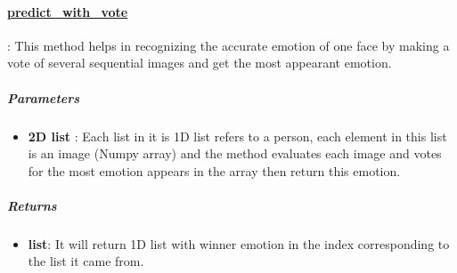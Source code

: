 \begin{comment}

\begin{itemize}
	\item call method:
	\begin{lstlisting}[language=Python]
	model.predict(faces, prob_emotion=False)\end{lstlisting}
\end{itemize}
\end{comment}
\hrulefill

\paragraph{\underline{predict\_with\_vote}}:
This method helps in recognizing the accurate emotion of one face by making a vote of several sequential images and get the most appearant emotion. \newline

\subparagraph{Parameters}
\begin{changemargin}{0.5cm}{0cm}
\begin{itemize}
	\item \textbf{2D list }:\newline
	Each list in it is 1D list refers to a person, each element in this list is an image (Numpy array) and the method evaluates each image and votes for the most emotion appears in the array then return this emotion.
\end{itemize}
\end{changemargin}

\subparagraph{Returns}
\begin{changemargin}{0.5cm}{0cm}
\begin{itemize}
	\item \textbf{list}:\newline
	It will return 1D list with winner emotion in the index corresponding to the list it came from.
\end{itemize}
\end{changemargin}

\begin{comment}
\subparagraph{Usage}:
\begin{changemargin}{0.5cm}{0cm}

\begin{itemize}
	\item call method:
	\begin{lstlisting}[language=Python]
	model.predict_with_vote(faces)\end{lstlisting}
\end{itemize}
\end{changemargin}
\end{comment}
\hrulefill
